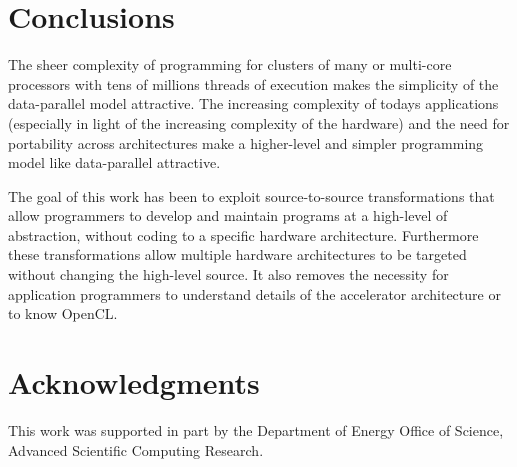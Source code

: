 \documentclass{acm_proc_article-sp}
\begin{document}





%


\section{Conclusions}

The sheer complexity of programming for clusters of many or multi-core
processors with tens of millions threads of execution makes the simplicity of
the data-parallel model attractive.  The increasing complexity of
todays applications (especially in light of the increasing complexity
of the hardware) and the need for portability across architectures
make a higher-level and simpler programming model like data-parallel
attractive.

The goal of this work has been to exploit source-to-source transformations that
allow programmers to develop and maintain programs at a high-level of
abstraction, without coding to a specific hardware architecture.
Furthermore these transformations allow multiple hardware architectures
to be targeted without changing the high-level source.  It also removes the
necessity for application programmers to understand details of the accelerator
architecture or to know OpenCL.

\section{Acknowledgments}
This work was supported in part by the Department of Energy Office of Science,
Advanced Scientific Computing Research.





\balancecolumns
\end{document}
